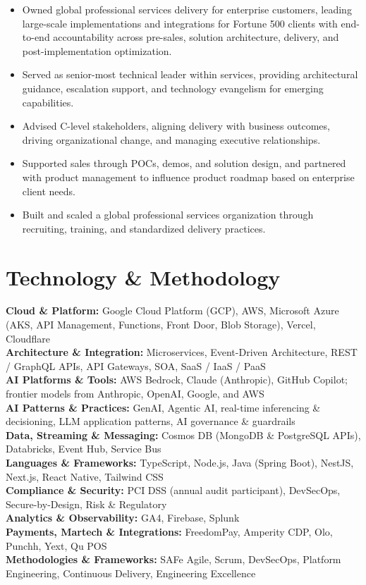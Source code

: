 \documentclass[11pt]{article}
\begin{document}
\begin{itemize}
  \item Owned global professional services delivery for enterprise customers, leading large-scale implementations and integrations for Fortune 500 clients with end-to-end accountability across pre-sales, solution architecture, delivery, and post-implementation optimization.
  \item Served as senior-most technical leader within services, providing architectural guidance, escalation support, and technology evangelism for emerging capabilities.
  \item Advised C-level stakeholders, aligning delivery with business outcomes, driving organizational change, and managing executive relationships.
  \item Supported sales through POCs, demos, and solution design, and partnered with product management to influence product roadmap based on enterprise client needs.
  \item Built and scaled a global professional services organization through recruiting, training, and standardized delivery practices.
\end{itemize}

\section*{Technology \& Methodology}
\textbf{Cloud \& Platform:} Google Cloud Platform (GCP), AWS, Microsoft Azure (AKS, API Management, Functions, Front Door, Blob Storage), Vercel, Cloudflare \\
\textbf{Architecture \& Integration:} Microservices, Event-Driven Architecture, REST / GraphQL APIs, API Gateways, SOA, SaaS / IaaS / PaaS \\
\textbf{AI Platforms \& Tools:} AWS Bedrock, Claude (Anthropic), GitHub Copilot; frontier models from Anthropic, OpenAI, Google, and AWS \\
\textbf{AI Patterns \& Practices:} GenAI, Agentic AI, real-time inferencing \& decisioning, LLM application patterns, AI governance \& guardrails \\
\textbf{Data, Streaming \& Messaging:} Cosmos DB (MongoDB \& PostgreSQL APIs), Databricks, Event Hub, Service Bus \\
\textbf{Languages \& Frameworks:} TypeScript, Node.js, Java (Spring Boot), NestJS, Next.js, React Native, Tailwind CSS \\
\textbf{Compliance \& Security:} PCI DSS (annual audit participant), DevSecOps, Secure-by-Design, Risk \& Regulatory \\
\textbf{Analytics \& Observability:} GA4, Firebase, Splunk \\
\textbf{Payments, Martech \& Integrations:} FreedomPay, Amperity CDP, Olo, Punchh, Yext, Qu POS \\
\textbf{Methodologies \& Frameworks:} SAFe Agile, Scrum, DevSecOps, Platform Engineering, Continuous Delivery, Engineering Excellence
\end{document}
